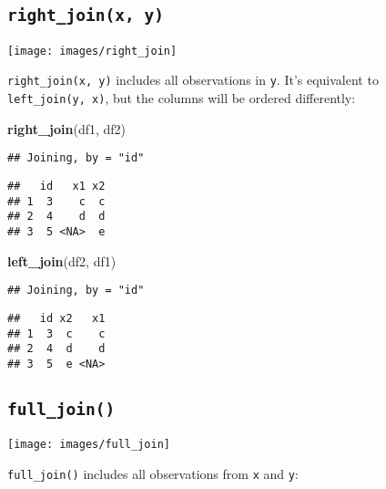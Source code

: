 \documentclass[]{book}
\newenvironment{Shaded}{\begin{snugshade}}{\end{snugshade}}
\newcommand{\KeywordTok}[1]{\textcolor[rgb]{0.13,0.29,0.53}{\textbf{{#1}}}}
\newcommand{\NormalTok}[1]{{#1}}
\begin{document}
\subsection{\texorpdfstring{\texttt{right\_join(x,\ y)}}{right\_join(x, y)}}\label{right_joinx-y}

\begin{center}\texttt{[image: images/right\_join]} \end{center}

\texttt{right\_join(x,\ y)} includes all observations in \texttt{y}.
It's equivalent to \texttt{left\_join(y,\ x)}, but the columns will be
ordered differently:

\begin{Shaded}
\begin{Highlighting}[]
\KeywordTok{right_join}\NormalTok{(df1, df2)}
\end{Highlighting}
\end{Shaded}

\begin{verbatim}
## Joining, by = "id"
\end{verbatim}

\begin{verbatim}
##   id   x1 x2
## 1  3    c  c
## 2  4    d  d
## 3  5 <NA>  e
\end{verbatim}

\begin{Shaded}
\begin{Highlighting}[]
\KeywordTok{left_join}\NormalTok{(df2, df1)}
\end{Highlighting}
\end{Shaded}

\begin{verbatim}
## Joining, by = "id"
\end{verbatim}

\begin{verbatim}
##   id x2   x1
## 1  3  c    c
## 2  4  d    d
## 3  5  e <NA>
\end{verbatim}

\subsection{\texorpdfstring{\texttt{full\_join()}}{full\_join()}}\label{full_join}

\begin{center}\texttt{[image: images/full\_join]} \end{center}

\texttt{full\_join()} includes all observations from \texttt{x} and
\texttt{y}:
\end{document}
